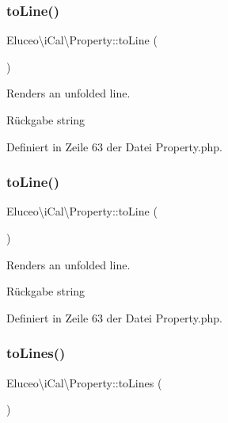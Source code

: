 \subsubsection{\texorpdfstring{to\+Line()}{toLine()}\hspace{0.1cm}{\footnotesize\ttfamily [2/3]}}
{\footnotesize\ttfamily Eluceo\textbackslash{}i\+Cal\textbackslash{}\+Property\+::to\+Line (\begin{DoxyParamCaption}{ }\end{DoxyParamCaption})}

Renders an unfolded line.

\begin{DoxyReturn}{Rückgabe}
string 
\end{DoxyReturn}


Definiert in Zeile 63 der Datei Property.\+php.

\mbox{\label{class_eluceo_1_1i_cal_1_1_property_a8b154e23bd0673f5afb2b6fd450991f2}} 
\subsubsection{\texorpdfstring{to\+Line()}{toLine()}\hspace{0.1cm}{\footnotesize\ttfamily [3/3]}}
{\footnotesize\ttfamily Eluceo\textbackslash{}i\+Cal\textbackslash{}\+Property\+::to\+Line (\begin{DoxyParamCaption}{ }\end{DoxyParamCaption})}

Renders an unfolded line.

\begin{DoxyReturn}{Rückgabe}
string 
\end{DoxyReturn}


Definiert in Zeile 63 der Datei Property.\+php.

\mbox{\label{class_eluceo_1_1i_cal_1_1_property_a815fd5c038ec6f86b9f117f2e3d5bb7f}} 
\subsubsection{\texorpdfstring{to\+Lines()}{toLines()}\hspace{0.1cm}{\footnotesize\ttfamily [1/3]}}
{\footnotesize\ttfamily Eluceo\textbackslash{}i\+Cal\textbackslash{}\+Property\+::to\+Lines (\begin{DoxyParamCaption}{ }\end{DoxyParamCaption})}

